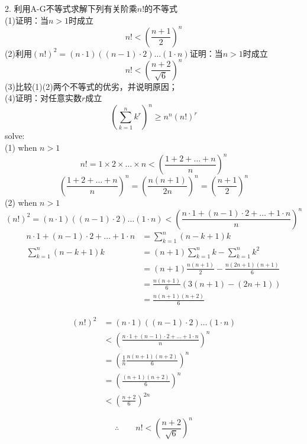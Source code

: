 \documentclass[10pt,a4paper]{book}
\begin{document}
	
	2. 利用A-G不等式求解下列有关阶乘$ n! $的不等式\\
	(1)证明：当$ n>1 $时成立
	\begin{equation}
		n!<(\frac{n+1}{2})^n 
	\end{equation}
	(2)利用$ (n!)^2 = (n\cdot 1)((n-1)\cdot 2)\dots(1\cdot n) $证明：当$ n>1 $时成立
	\begin{equation}
		n!<(\frac{n+2}{\sqrt{6}})^n
	\end{equation}
	(3)比较(1)(2)两个不等式的优劣，并说明原因；\\
	(4)证明：对任意实数$ r $成立
	\begin{equation}
		(\sum_{k=1}^n k^r)^n \ge n^n(n!)^r
	\end{equation}
	solve:\\
	(1) when $ n>1 $
	\[  n! = 1\times 2\times\dots\times n < (\frac{1+2+\dots + n}{n})^n  \]
	\[ (\frac{1+2+\dots + n}{n})^n = (\frac{n(n+1)}{2n})^n = (\frac{n+1}{2})^n \]
	(2) when $ n>1 $
	\[ (n!)^2 = (n\cdot 1)((n-1)\cdot 2)\dots(1\cdot n) < (\frac{n\cdot 1 + (n-1)\cdot 2 + \dots + 1\cdot n}{n})^n \]
	\begin{equation*}
		\begin{aligned}
			n\cdot 1 + (n-1)\cdot 2 + \dots + 1\cdot n &= \sum_{k=1}^n (n-k+1)k \\
			\sum_{k=1}^n (n-k+1)k 
			&= (n+1)\sum_{k=1}^n k-\sum_{k=1}^n k^2\\
			&= (n+1)\frac{n(n+1)}{2}-\frac{n(2n+1)(n+1)}{6}\\
			&= \frac{n(n+1)}{6}(3(n+1)-(2n+1))\\
			&= \frac{n(n+1)(n+2)}{6}
		\end{aligned}
	\end{equation*}
	
	\begin{equation*}
		\begin{aligned}
			(n!)^2  &= (n\cdot 1)((n-1)\cdot 2)\dots(1\cdot n)\\
					&< (\frac{n\cdot 1 + (n-1)\cdot 2 + \dots + 1\cdot n}{n})^n\\
					&= (\frac{1}{n}\frac{n(n+1)(n+2)}{6})^n\\
					&= (\frac{(n+1)(n+2)}{6})^n\\
					&< (\frac{n+2}{6})^{2n}
		\end{aligned}
	\end{equation*}

	\begin{equation*}
		\therefore \qquad	n! < (\frac{n+2}{\sqrt{6}})^{n}
	\end{equation*}
	
\end{document}
